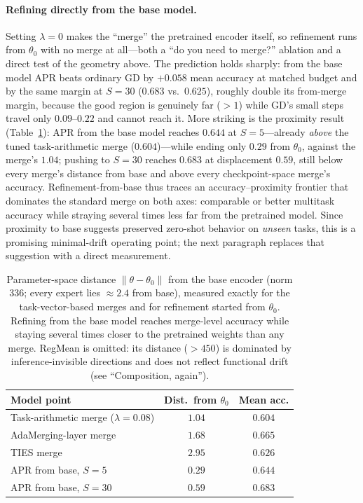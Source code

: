 \documentclass[11pt]{article}
\begin{document}
\paragraph{Refining directly from the base model.}
Setting $\lambda=0$ makes the ``merge'' the pretrained encoder itself, so refinement runs from $\theta_0$ with no merge at all---both a ``do you need to merge?'' ablation and a direct test of the geometry above. The prediction holds sharply: from the base model APR beats ordinary GD by $+0.058$ mean accuracy at matched budget and by the same margin at $S=30$ ($0.683$ vs.\ $0.625$), roughly double its from-merge margin, because the good region is genuinely far ($>1$) while GD's small steps travel only $0.09$--$0.22$ and cannot reach it. More striking is the proximity result (Table~\ref{tab:clip20dist}): APR from the base model reaches $0.644$ at $S=5$---already \emph{above} the tuned task-arithmetic merge ($0.604$)---while ending only $0.29$ from $\theta_0$, against the merge's $1.04$; pushing to $S=30$ reaches $0.683$ at displacement $0.59$, still below every merge's distance from base and above every checkpoint-space merge's accuracy. Refinement-from-base thus traces an accuracy--proximity frontier that dominates the standard merge on both axes: comparable or better multitask accuracy while straying several times less far from the pretrained model. Since proximity to base suggests preserved zero-shot behavior on \emph{unseen} tasks, this is a promising minimal-drift operating point; the next paragraph replaces that suggestion with a direct measurement.

\begin{table}[t]
\centering
\small
\caption{Parameter-space distance $\lVert\theta-\theta_0\rVert$ from the base encoder (norm $336$; every expert lies ${\approx}2.4$ from base), measured exactly for the task-vector-based merges and for refinement started from $\theta_0$. Refining from the base model reaches merge-level accuracy while staying several times closer to the pretrained weights than any merge. RegMean is omitted: its distance ($>450$) is dominated by inference-invisible directions and does not reflect functional drift (see ``Composition, again'').}
\label{tab:clip20dist}
\begin{tabular}{lcc}
\toprule
Model point & Dist.\ from $\theta_0$ & Mean acc. \\
\midrule
Task-arithmetic merge ($\lambda{=}0.08$)   & $1.04$ & $0.604$ \\
AdaMerging-layer merge                     & $1.68$ & $0.665$ \\
TIES merge                                 & $2.95$ & $0.626$ \\
\midrule
APR from base, $S{=}5$                      & $\mathbf{0.29}$ & $0.644$ \\
APR from base, $S{=}30$                     & $0.59$ & $0.683$ \\
\bottomrule
\end{tabular}
\end{table}
\end{document}
